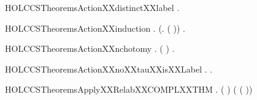 \newcommand{\HOLCCSTheoremsActionXXdistinct}{\UseVerbatim{HOLCCSTheoremsActionXXdistinct}}
\begin{SaveVerbatim}{HOLCCSTheoremsActionXXdistinctXXlabel}
\HOLTokenTurnstile{} \HOLSymConst{\HOLTokenForall{}}.   \HOLSymConst{\HOLTokenNotEqual{}} \HOLConst{\ensuremath{\tau}}
\end{SaveVerbatim}
\newcommand{\HOLCCSTheoremsActionXXdistinctXXlabel}{\UseVerbatim{HOLCCSTheoremsActionXXdistinctXXlabel}}
\begin{SaveVerbatim}{HOLCCSTheoremsActionXXinduction}
\HOLTokenTurnstile{} \HOLSymConst{\HOLTokenForall{}}.  \HOLConst{\ensuremath{\tau}} \HOLSymConst{\HOLTokenConj{}} (\HOLSymConst{\HOLTokenForall{}}.  ( )) \HOLSymConst{\HOLTokenImp{}} \HOLSymConst{\HOLTokenForall{}}.  
\end{SaveVerbatim}
\newcommand{\HOLCCSTheoremsActionXXinduction}{\UseVerbatim{HOLCCSTheoremsActionXXinduction}}
\begin{SaveVerbatim}{HOLCCSTheoremsActionXXnchotomy}
\HOLTokenTurnstile{} \HOLSymConst{\HOLTokenForall{}}. ( \HOLSymConst{=} \HOLConst{\ensuremath{\tau}}) \HOLSymConst{\HOLTokenDisj{}} \HOLSymConst{\HOLTokenExists{}}.  \HOLSymConst{=}  
\end{SaveVerbatim}
\newcommand{\HOLCCSTheoremsActionXXnchotomy}{\UseVerbatim{HOLCCSTheoremsActionXXnchotomy}}
\begin{SaveVerbatim}{HOLCCSTheoremsActionXXnoXXtauXXisXXLabel}
\HOLTokenTurnstile{} \HOLSymConst{\HOLTokenForall{}}.  \HOLSymConst{\HOLTokenNotEqual{}} \HOLConst{\ensuremath{\tau}} \HOLSymConst{\HOLTokenImp{}} \HOLSymConst{\HOLTokenExists{}}.  \HOLSymConst{=}  
\end{SaveVerbatim}
\newcommand{\HOLCCSTheoremsActionXXnoXXtauXXisXXLabel}{\UseVerbatim{HOLCCSTheoremsActionXXnoXXtauXXisXXLabel}}
\begin{SaveVerbatim}{HOLCCSTheoremsApplyXXRelabXXCOMPLXXTHM}
\HOLTokenTurnstile{} \HOLSymConst{\HOLTokenForall{}} .
         ( ) \HOLSymConst{=}
        (  ( ))
\end{SaveVerbatim}
